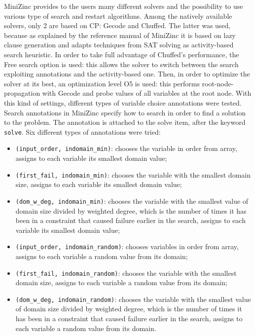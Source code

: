 \documentclass[a4paper, 12pt]{article}
\begin{document}
MiniZinc provides to the users many different solvers and the possibility to use various type of search and restart algorithms. Among the natively available solvers, only 2 are based on CP: Gecode and Chuffed. The latter was used, because as explained by the reference manual of MiniZinc it is based on lazy clause generation and adapts techniques from SAT solving as activity-based search heuristic. In order to take full advantage of Chuffed’s performance, the Free search option is used: this allows the solver to switch between the search exploiting annotations and the activity-based one. Then, in order to optimize the solver at its best, an optimization level O5 is used: this performs root-node-propagation with Gecode and probe values of all variables at the root node. With this kind of settings, different types of variable choice annotations were tested. Search annotations in MiniZinc specify how to search in order to find a solution to the problem. The annotation is attached to the solve item, after the keyword \verb|solve|. Six different types of annotations were tried:
\begin{itemize}
    \item \verb|(input_order, indomain_min)|: chooses the variable in order from array, assigns to each variable its smallest domain value;
    \item \verb|(first_fail, indomain_min)|: chooses the variable with the smallest domain size, assigns to each variable its smallest domain value;
    \item \verb|(dom_w_deg, indomain_min)|: chooses the variable with the smallest value of domain size divided by weighted degree, which is the number of times it has been in a constraint that caused failure earlier in the search, assigns to each variable its smallest domain value;
    \item \verb|(input_order, indomain_random)|: chooses variables in order from array, assigns to each variable a random value from its domain;
    \item \verb|(first_fail, indomain_random)|: chooses the variable with the smallest domain size, assigns to each variable a random value from its domain;
    \item \verb|(dom_w_deg, indomain_random)|: chooses the variable with the smallest value of domain size divided by weighted degree, which is the number of times it has been in a constraint that caused failure earlier in the search, assigns to each variable a random value from its domain.
\end{itemize}
\end{document}
